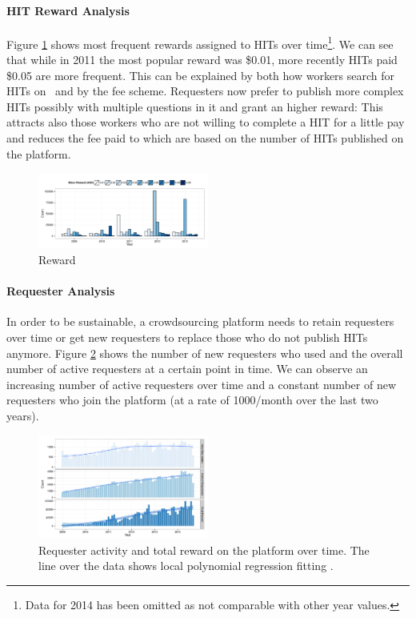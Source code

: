 \paragraph{HIT Reward Analysis}
Figure \ref{fig:reward_year} shows most frequent rewards assigned to HITs over time\footnote{Data for 2014 has been omitted as not comparable with other year values.}. We can see that while in 2011 the most popular reward was \$0.01, more recently HITs paid \$0.05 are more frequent. This can be explained by both how workers search for HITs on \amt\ and by the \amt fee scheme. Requesters now prefer to publish more complex HITs possibly with multiple questions in it and grant an higher reward: This attracts also those workers who are not willing to complete a HIT for a little pay and reduces the fee paid to \amt which are based on the number of HITs published on the platform.

\begin{figure}[htbp]
	\centering
		\includegraphics[width=0.5\textwidth]{figures/reward_year}
	\caption{Reward }
	\label{fig:reward_year}
\end{figure}



\paragraph{Requester Analysis}
In order to be sustainable, a crowdsourcing platform needs to retain requesters over time or get new requesters to replace those who do not publish HITs anymore. Figure \ref{fig:requesters_reward} shows the number of new requesters who used \amt and the overall number of active requesters at a certain point in time. We can observe an increasing number of active requesters over time and a constant number of new requesters who join the platform (at a rate of 1000/month over the last two years).

\begin{figure}[htbp]
	\centering
		\includegraphics[width=0.5\textwidth]{figures/requesters_reward}
	\caption{Requester activity and total reward on the platform over time. The line over the data shows local polynomial regression fitting \cite{cleveland1992local}.}
	\label{fig:requesters_reward}
\end{figure}

